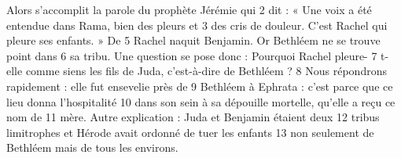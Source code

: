 Alors s'accomplit la parole du prophète Jérémie qui	 
2	 	dit : « Une voix a été entendue dans Rama, bien des pleurs et	 
3	 	des cris de douleur. C'est Rachel qui pleure ses enfants. » De	 
5	 	Rachel naquit Benjamin. Or Bethléem ne se trouve point dans	 
6	 	sa tribu. Une question se pose donc : Pourquoi Rachel pleure-	 
7	 	t-elle comme siens les fils de Juda, c'est-à-dire de Bethléem ?	 
8	 	Nous répondrons rapidement : elle fut ensevelie près de	 
9	 	Bethléem à Ephrata : c'est parce que ce lieu donna l'hospitalité	 
10	 	dans son sein à sa dépouille mortelle, qu'elle a reçu ce nom de	 
11	 	mère. Autre explication : Juda et Benjamin étaient deux	 
12	 	tribus limitrophes et Hérode avait ordonné de tuer les enfants	 
13	 	non seulement de Bethléem mais de tous les environs.